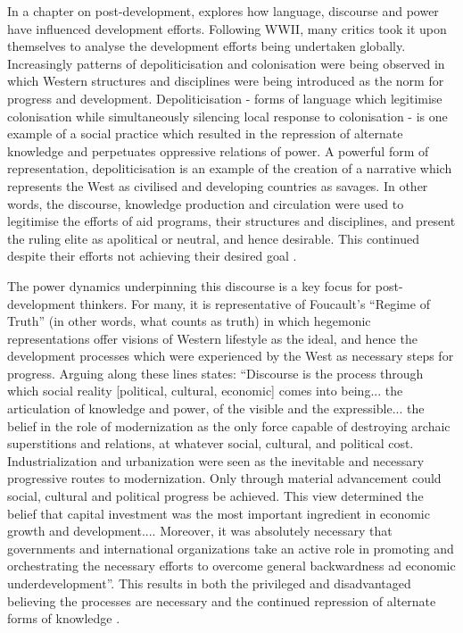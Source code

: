 In a chapter on post-development, \citet{Sahle2009} explores how language, discourse and power have influenced development efforts. Following WWII, many critics took it upon themselves to analyse the development efforts being undertaken globally. Increasingly patterns of depoliticisation and colonisation were being observed in which Western structures and disciplines were being introduced as the norm for progress and development. Depoliticisation - forms of language which legitimise colonisation while simultaneously silencing local response to colonisation - is one example of a social practice which resulted in the repression of alternate knowledge and perpetuates oppressive relations of power. A powerful form of representation, depoliticisation is an example of the creation of a narrative which represents the West as civilised and developing countries as savages. In other words, the discourse, knowledge production and circulation were used to legitimise the efforts of aid programs, their structures and disciplines, and present the ruling elite as apolitical or neutral, and hence desirable. This continued despite their efforts not achieving their desired goal \citep{Sahle2009}. 


The power dynamics underpinning this discourse is a key focus for post-development thinkers. For many, it is representative of Foucault's “Regime of Truth” (in other words, what counts as truth) in which hegemonic representations offer visions of Western lifestyle as the ideal, and hence the development processes which were experienced by the West as necessary steps for progress. Arguing along these lines \citet[][p39-40]{Escobar1995} states: “Discourse is the process through which social reality [political, cultural, economic] comes into being... the articulation of knowledge and power, of the visible and the expressible... the belief in the role of modernization as the only force capable of destroying archaic superstitions and relations, at whatever social, cultural, and political cost. Industrialization and urbanization were seen as the inevitable and necessary progressive routes to modernization. Only through material advancement could social, cultural and political progress be achieved. This view determined the belief that capital investment was the most important ingredient in economic growth and development.... Moreover, it was absolutely necessary that governments and international organizations take an active role in promoting and orchestrating the necessary efforts to overcome general backwardness ad economic underdevelopment”. This results in both the privileged and disadvantaged believing the processes are necessary and the continued repression of alternate forms of knowledge \citep{Sahle2009}. 









